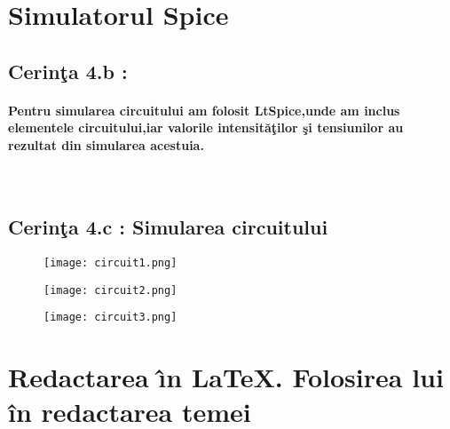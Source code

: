 \documentclass[12pt,twoside]{report}
\numberwithin{figure}{section}
\begin{document}
	
	
	\newpage
	
	\section{Simulatorul Spice}
			\hfill
			
			\subsection{Cerin\c{t}a 4.b : }
			\hfill
			\paragraph{Pentru simularea circuitului am folosit LtSpice,unde am inclus elementele circuitului,iar valorile intensit\u{a}\c{t}ilor \c{s}i tensiunilor au rezultat din simularea acestuia.}
			\\
			\begin{alltt}
				
			\end{alltt}
			
		
			\subsection{Cerin\c{t}a 4.c : Simularea circuitului}
			
			\vspace{1cm}
			
			\begin{figure}
			\texttt{[image: circuit1.png]}\vspace{1cm}
			\end{figure}
			
			\begin{figure}
			\texttt{[image: circuit2.png]}\vspace{1cm}
			\end{figure}
			
			\begin{figure}
			\texttt{[image: circuit3.png]}\vspace{1cm}
			\end{figure}

	\endpage
	
	\newpage	
	\section{Redactarea \^{\i }n \LaTeX . Folosirea lui \^{i}n redactarea temei}
	\hfill
	
\end{document}

